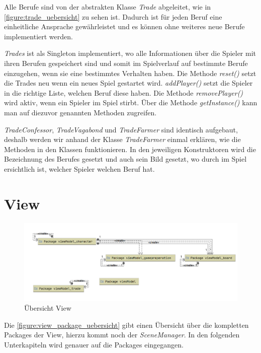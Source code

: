 Alle Berufe sind von der abstrakten Klasse \textit{Trade} abgeleitet, wie in \autoref{figure:trade_uebersicht} zu sehen ist. Dadurch ist für jeden Beruf eine einheitliche Ansprache gewährleistet und es können ohne weiteres neue Berufe implementiert werden.

\medskip
\textit{Trades} ist als Singleton implementiert, wo alle Informationen über die Spieler mit ihren Berufen gespeichert sind und somit im Spielverlauf auf bestimmte Berufe einzugehen, wenn sie eine bestimmtes Verhalten haben.
Die Methode \textit{reset()} setzt die Trades neu wenn ein neues Spiel gestartet wird.
\textit{addPlayer()} setzt die Spieler in die richtige Liste, welchen Beruf diese haben. Die Methode \textit{removePlayer()} wird aktiv, wenn ein Spieler im Spiel stirbt. Über die Methode \textit{getInstance()} kann man auf diezuvor genannten Methoden zugreifen.

\medskip
\textit{TradeConfessor}, \textit{TradeVagabond} und \textit{TradeFarmer} sind identisch aufgebaut, deshalb werden wir anhand der Klasse \textit{TradeFarmer} einmal erklären, wie die Methoden in den Klassen funktionieren.
In den jeweiligen Konstruktoren wird die Bezeichnung des Berufes gesetzt und auch sein Bild gesetzt, wo durch im Spiel ersichtlich ist, welcher Spieler welchen Beruf hat.
  
\section{View}

\begin{figure}[H]
	\centering
	\includegraphics[width=\textwidth]{architektur/View_Packages_Uebersicht.png}
	\caption{Übersicht View}
	\label{figure:view_package_uebersicht}
\end{figure}

Die \autoref{figure:view_package_uebersicht} gibt einen Übersicht über die kompletten Packages der View, hierzu kommt noch der \textit{SceneManager}. 
In den folgenden Unterkapiteln wird genauer auf die Packages eingegangen. 

